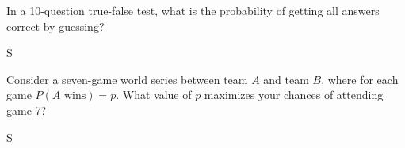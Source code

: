 \documentclass[answers]{exam}
\begin{document}
\begin{questions}
\question 
In a 10-question true-false test, what is the probability of getting all answers correct by guessing?
\begin{solution}
	S
\end{solution}

\question 
Consider a seven-game world series between team $A$ and team $B$, where for each game \(P(A\text{ wins})=p\). What value of $p$ maximizes your chances of attending game 7?
\begin{solution}
	S
\end{solution}

\end{questions}
\end{document}
